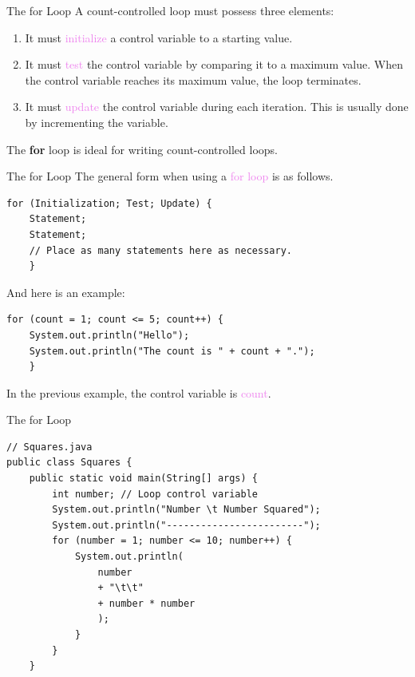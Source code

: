 \documentclass[11pt]{beamer}
\newcommand{\violet}[1]{\textcolor{violet}{#1}}
\begin{document}
\begin{frame}{The for Loop}
A count-controlled loop must possess three elements:
\begin{enumerate}
    \item It must \violet{initialize} a control variable to a starting value.
    \item It must \violet{test} the control variable by comparing it to a maximum value. When the control variable reaches its maximum value, the loop terminates.
    \item It must \violet{update} the control variable during each iteration. This is usually done by incrementing the variable.
\end{enumerate}
The \textbf{for} loop is ideal for writing count-controlled loops.
\end{frame}

\begin{frame}[fragile]{The for Loop}
    The general form when using a \violet{for loop} is as follows.
    \begin{lstlisting}
for (Initialization; Test; Update) {
    Statement;
    Statement;
    // Place as many statements here as necessary.
    }
    \end{lstlisting}
And here is an example:
    \begin{lstlisting}
for (count = 1; count <= 5; count++) {
    System.out.println("Hello");
    System.out.println("The count is " + count + ".");
    }
    \end{lstlisting}
    In the previous example, the control variable is \violet{count}.
\end{frame}

\begin{frame}[fragile]{The for Loop}
\begin{lstlisting}
// Squares.java
public class Squares {
    public static void main(String[] args) {
        int number; // Loop control variable
        System.out.println("Number \t Number Squared");
        System.out.println("------------------------");
        for (number = 1; number <= 10; number++) {
            System.out.println(
                number
                + "\t\t"
                + number * number
                );
            }
        }
    }
\end{lstlisting}
\end{frame}
\end{document}
